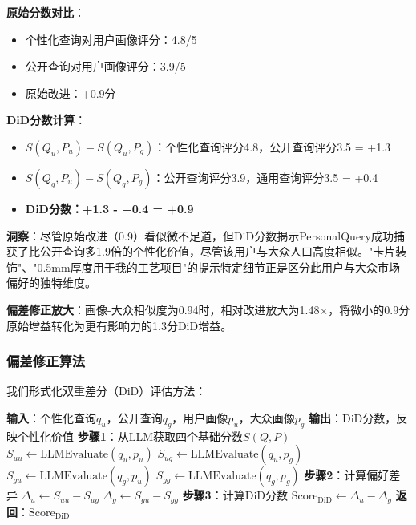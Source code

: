 \documentclass[11pt,a4paper]{article}
\begin{document}
\textbf{原始分数对比}：
\begin{itemize}
    \item 个性化查询对用户画像评分：4.8/5
    \item 公开查询对用户画像评分：3.9/5
    \item 原始改进：+0.9分
\end{itemize}

\textbf{DiD分数计算}：
\begin{itemize}
    \item $S(Q_u, P_u) - S(Q_u, P_g)$：个性化查询评分4.8，公开查询评分3.5 = +1.3
    \item $S(Q_g, P_u) - S(Q_g, P_g)$：公开查询评分3.9，通用查询评分3.5 = +0.4
    \item \textbf{DiD分数：+1.3 - +0.4 = +0.9}
\end{itemize}

\textbf{洞察}：尽管原始改进（0.9）看似微不足道，但DiD分数揭示PersonalQuery成功捕获了比公开查询多1.9倍的个性化价值，尽管该用户与大众人口高度相似。"卡片装饰"、"0.5mm厚度用于我的工艺项目"的提示特定细节正是区分此用户与大众市场偏好的独特维度。

\textbf{偏差修正放大}：画像-大众相似度为0.94时，相对改进放大为1.48$\times$，将微小的0.9分原始增益转化为更有影响力的1.3分DiD增益。

\subsubsection{偏差修正算法}

我们形式化双重差分（DiD）评估方法：

\begin{algorithm}[h]
\caption{基于DiD的查询评估}
\begin{algorithmic}[1]
\State \textbf{输入}：个性化查询$q_u$，公开查询$q_g$，用户画像$p_u$，大众画像$p_g$
\State \textbf{输出}：DiD分数，反映个性化价值
\State
\State \textbf{步骤1}：从LLM获取四个基础分数$S(Q, P)$
\State $S_{uu} \gets \text{LLMEvaluate}(q_u, p_u)$ 
\State $S_{ug} \gets \text{LLMEvaluate}(q_u, p_g)$ 
\State $S_{gu} \gets \text{LLMEvaluate}(q_g, p_u)$ 
\State $S_{gg} \gets \text{LLMEvaluate}(q_g, p_g)$ 
\State
\State \textbf{步骤2}：计算偏好差异
\State $\Delta_u \gets S_{uu} - S_{ug}$ 
\State $\Delta_g \gets S_{gu} - S_{gg}$ 
\State
\State \textbf{步骤3}：计算DiD分数
\State $\text{Score}_{\text{DiD}} \gets \Delta_u - \Delta_g$
\State
\State \textbf{返回}：$\text{Score}_{\text{DiD}}$
\end{algorithmic}
\end{algorithm}
\end{document}

